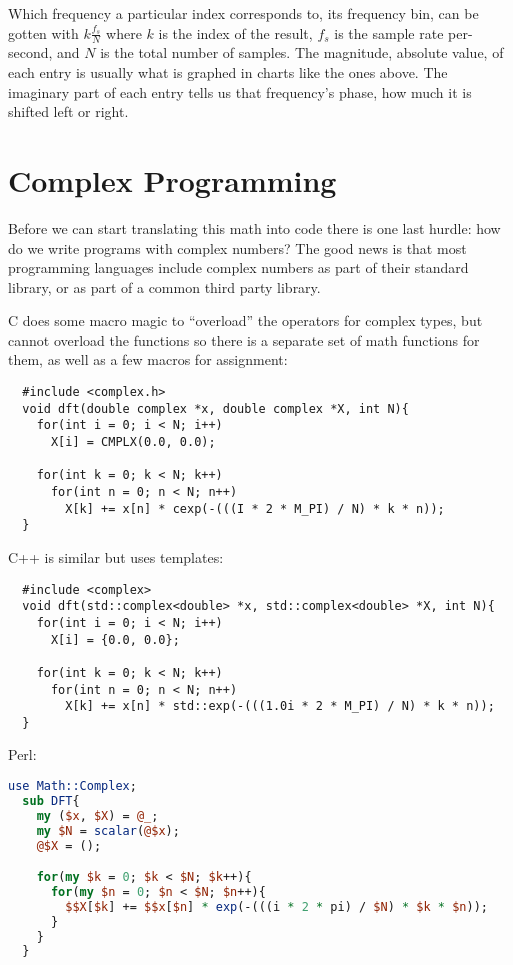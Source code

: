 \documentclass[12pt]{article}
\begin{document}
Which frequency a particular index corresponds to, its frequency bin, can be gotten with $k\frac{f_s}{N}$
where $k$ is the index of the result, $f_s$ is the sample rate per-second, and $N$ is the total number of samples. The magnitude, absolute value, of each entry is usually what is graphed in charts like the ones above. The imaginary part of each entry tells us that frequency's phase, how much it is shifted left or right.
\pagebreak

\section{Complex Programming}

Before we can start translating this math into code there is one last hurdle: how do we write programs with complex numbers? The good news is that most programming languages include complex numbers as part of their standard library, or as part of a common third party library.

C does some macro magic to ``overload'' the operators for complex types, but cannot overload the functions so there is a separate set of math functions for them, as well as a few macros for assignment:
\begin{lstlisting}
  #include <complex.h>
  void dft(double complex *x, double complex *X, int N){
    for(int i = 0; i < N; i++)
      X[i] = CMPLX(0.0, 0.0);

    for(int k = 0; k < N; k++)
      for(int n = 0; n < N; n++)
        X[k] += x[n] * cexp(-(((I * 2 * M_PI) / N) * k * n));
  }
\end{lstlisting}

C++ is similar but uses templates:
\begin{lstlisting}
  #include <complex>
  void dft(std::complex<double> *x, std::complex<double> *X, int N){
    for(int i = 0; i < N; i++)
      X[i] = {0.0, 0.0};

    for(int k = 0; k < N; k++)
      for(int n = 0; n < N; n++)
        X[k] += x[n] * std::exp(-(((1.0i * 2 * M_PI) / N) * k * n));
  }
\end{lstlisting}

Perl:
\begin{lstlisting}[language=Perl]
  use Math::Complex;
  sub DFT{
    my ($x, $X) = @_;
    my $N = scalar(@$x);
    @$X = ();

    for(my $k = 0; $k < $N; $k++){
      for(my $n = 0; $n < $N; $n++){
        $$X[$k] += $$x[$n] * exp(-(((i * 2 * pi) / $N) * $k * $n));
      }
    }
  }
\end{lstlisting}
\end{document}
